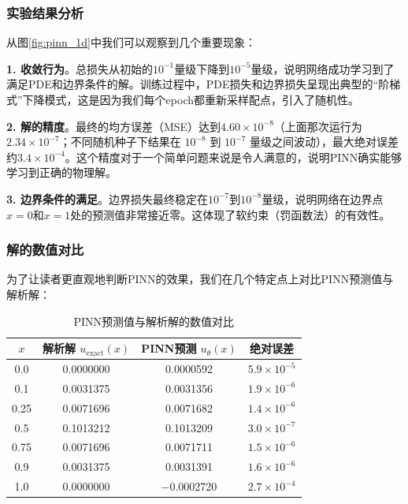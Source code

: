 \subsubsection{实验结果分析}

从图\ref{fig:pinn_1d}中我们可以观察到几个重要现象：

\textbf{1. 收敛行为}。总损失从初始的$10^{-1}$量级下降到$10^{-5}$量级，说明网络成功学习到了满足PDE和边界条件的解。训练过程中，PDE损失和边界损失呈现出典型的“阶梯式”下降模式，这是因为我们每个epoch都重新采样配点，引入了随机性。

\textbf{2. 解的精度}。最终的均方误差（MSE）达到$4.60 \times 10^{-8}$（上面那次运行为 $2.34 \times 10^{-7}$；不同随机种子下结果在 $10^{-8}$ 到 $10^{-7}$ 量级之间波动），最大绝对误差约$3.4 \times 10^{-4}$。这个精度对于一个简单问题来说是令人满意的，说明PINN确实能够学习到正确的物理解。

\textbf{3. 边界条件的满足}。边界损失最终稳定在$10^{-7}$到$10^{-8}$量级，说明网络在边界点$x=0$和$x=1$处的预测值非常接近零。这体现了软约束（罚函数法）的有效性。

\subsubsection{解的数值对比}

为了让读者更直观地判断PINN的效果，我们在几个特定点上对比PINN预测值与解析解：

\begin{table}[htbp]
\centering
\caption{PINN预测值与解析解的数值对比}
\label{tab:pinn_comparison}
\begin{tabular}{c|ccc}
\hline
$x$ & 解析解 $u_{\text{exact}}(x)$ & PINN预测 $u_\theta(x)$ & 绝对误差 \\
\hline
0.0 & 0.0000000 & 0.0000592 & $5.9 \times 10^{-5}$ \\
0.1 & 0.0031375 & 0.0031356 & $1.9 \times 10^{-6}$ \\
0.25 & 0.0071696 & 0.0071682 & $1.4 \times 10^{-6}$ \\
0.5 & 0.1013212 & 0.1013209 & $3.0 \times 10^{-7}$ \\
0.75 & 0.0071696 & 0.0071711 & $1.5 \times 10^{-6}$ \\
0.9 & 0.0031375 & 0.0031391 & $1.6 \times 10^{-6}$ \\
1.0 & 0.0000000 & $-$0.0002720 & $2.7 \times 10^{-4}$ \\
\hline
\end{tabular}
\end{table}


